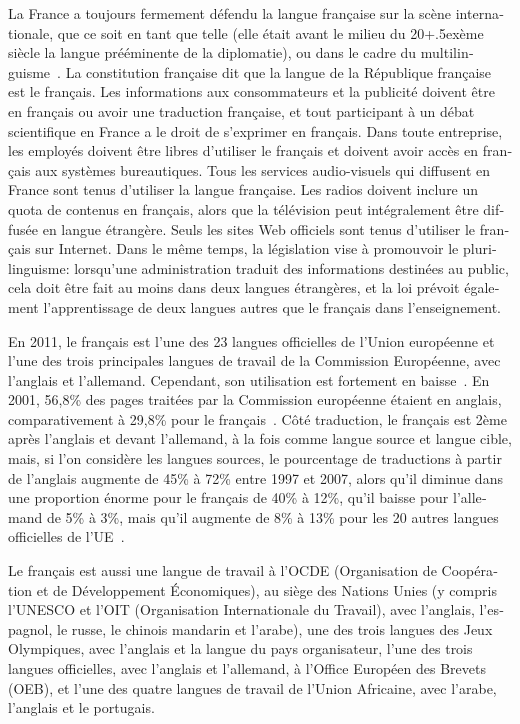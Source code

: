 \begin{french}
\begin{multicols}{2}
La France a toujours fermement défendu la langue française sur la
scène internationale, que ce soit en tant que telle (elle était avant
le milieu du 20\raise+.5ex\hbox{ème} siècle la langue prééminente de la diplomatie), ou
dans le cadre du multilinguisme~\cite{multilinguisme}. La constitution
française dit que la langue de la République française est le
français. Les informations aux consommateurs et la publicité doivent
être en français ou avoir une traduction française, et tout
participant à un débat scientifique en France a le droit de s'exprimer en français. Dans toute entreprise, les employés doivent
être libres d'utiliser le français et doivent avoir accès en
français aux systèmes bureautiques. Tous les services audio-visuels
qui diffusent en France sont tenus d'utiliser la langue française. Les
radios doivent inclure un quota de contenus en français, alors que la
télévision peut intégralement être diffusée en langue étrangère. Seuls
les sites Web officiels sont tenus d'utiliser le français sur
Internet. Dans le même temps, la législation vise à promouvoir le
plurilinguisme: lorsqu'une administration traduit des
informations destinées au public, cela doit être fait au moins dans
deux langues étrangères, et la loi prévoit également l'apprentissage 
de deux langues autres que le français dans l'enseignement.

En 2011, le français est l'une des 23 langues officielles de
l'Union européenne et l'une des trois principales
langues de travail de la Commission Européenne, avec l'anglais
et l'allemand. Cependant, son utilisation est fortement en
baisse~\cite{baisse}. En 2001, 56,8\% des pages traitées par la
Commission européenne étaient en anglais, comparativement à 29,8\%
pour le français~\cite{francais}. Côté traduction, le français
est 2ème après l'anglais et devant l'allemand, à la
fois comme langue source et langue cible, mais, si l'on
considère les langues sources, le pourcentage de traductions à partir
de l'anglais augmente de 45\% à 72\% entre 1997 et 2007, alors
qu'il diminue dans une proportion énorme pour le français de
40\% à 12\%, qu'il baisse pour l'allemand de 5\% à
3\%, mais qu'il augmente de 8\% à 13\% pour les 20 autres
langues officielles de l'UE~\cite{dgt08}.

Le français est aussi une langue de travail à l'OCDE
(Organisation de Coopération et de Développement Économiques), au
siège des Nations Unies (y compris l'UNESCO et l'OIT
(Organisation Internationale du Travail), avec l'anglais,
l'espagnol, le russe, le chinois mandarin et l'arabe),
une des trois langues des Jeux Olympiques, avec l'anglais et
la langue du pays organisateur, l'une des trois langues
officielles, avec l'anglais et l'allemand, à l'Office Européen des Brevets (OEB), et l'une des quatre
langues de travail de l'Union Africaine, avec l'arabe,
l'anglais et le portugais.


\end{multicols}
\end{french}
